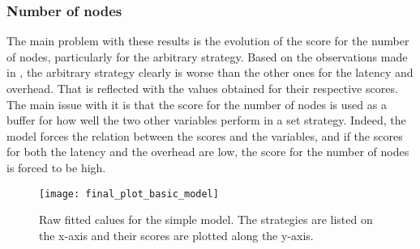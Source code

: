 \subsubsection{Number of nodes}
The main problem with these results is the evolution of the score for the number
of nodes, particularly for the arbitrary strategy. Based on the observations
made in , the arbitrary strategy clearly is worse than the other ones for
the latency and overhead. That is reflected with the values obtained for their
respective scores. The main issue with it is that the score for the number of
nodes is used as a buffer for how well the two other variables perform in a set
strategy. Indeed, the model forces the relation between the scores and the
variables, and if the scores for both the latency and the overhead are low, the
score for the number of nodes is forced to be high.

\begin{figure}[H]
    \centering
    \texttt{[image: final\_plot\_basic\_model]}
    \captionsetup{justification=centering}
    \caption{Raw fitted calues for the simple model. The strategies are listed
    on the x-axis and their scores are plotted along the y-axis. }
    \label{fig:recapTestsPlot}
\end{figure}


